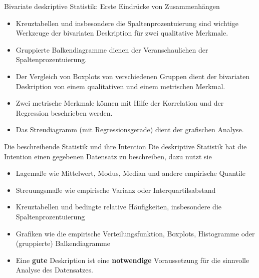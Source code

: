 \documentclass[usenames,dvipsnames,handout]{beamer}
\begin{document}
\begin{frame}{Bivariate deskriptive Statistik: Erste Eindrücke von Zusammenhängen}
\begin{itemize}
 \item {Kreuztabellen und insbesondere die Spaltenprozentuierung sind wichtige Werkzeuge 
    der bivariaten Deskription für zwei qualitative Merkmale.}\pause
    \item{Gruppierte Balkendiagramme dienen der Veranschaulichen der  Spaltenprozentuierung.}\pause
    \item{Der Vergleich von Boxplots von verschiedenen Gruppen dient der bivariaten Deskription 
    von einem qualitativen und einem metrischen Merkmal.}\pause
    \item{Zwei metrische Merkmale können mit Hilfe der Korrelation und der Regression beschrieben werden.}
    \item{Das Streudiagramm (mit Regressionsgerade) dient der grafischen Analyse.}
\end{itemize}
\end{frame}

\begin{frame}{Die beschreibende Statistik und ihre Intention}
Die deskriptive Statistik hat die Intention einen gegebenen Datensatz zu beschreiben, dazu nutzt sie
\begin{itemize}
\item{Lagemaße wie Mittelwert, Modus, Median und andere empirische Quantile}\pause
\item{Streuungsmaße wie empirische Varianz oder Interquartilsabstand}\pause
\item{Kreuztabellen und bedingte relative Häufigkeiten, insbesondere die Spaltenprozentuierung}\pause
\item{Grafiken wie die empirische Verteilungsfunktion, Boxplots, Histogramme
oder (gruppierte) Balkendiagramme}\pause
\item{Eine \colorbox{yellow!40}{\textbf{gute}} Deskription ist eine 
\colorbox{yellow!40}{\textbf{notwendige}} Voraussetzung für die 
sinnvolle Analyse des Datensatzes.}
\end{itemize}
\end{frame}
\end{document}
